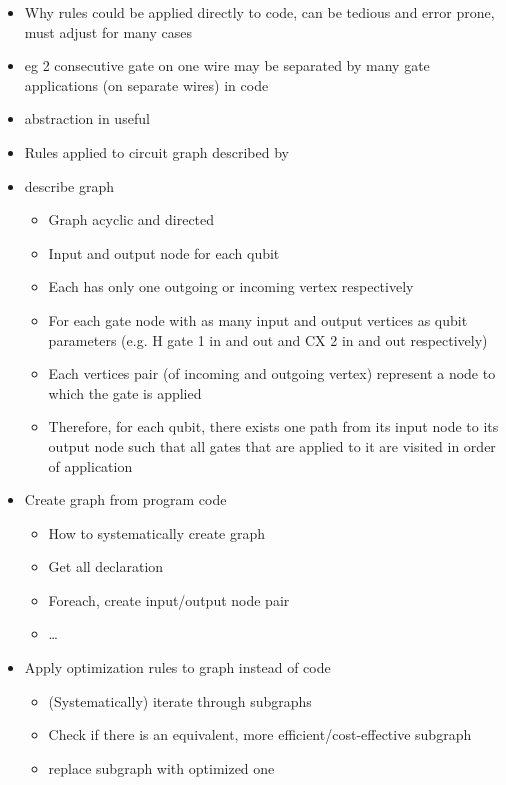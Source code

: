 \begin{itemize}
    \item Why rules could be applied directly to code, can be tedious and error prone, must adjust for many cases
    \item eg 2 consecutive gate on one wire may be separated by many gate applications (on separate wires) in code
    \item abstraction in useful
    \item Rules applied to circuit graph described by \cite{KMO*23}
    \item describe graph
    \begin{itemize}
        \item Graph acyclic and directed
        \item Input and output node for each qubit
        \item Each has only one outgoing or incoming vertex respectively
        \item For each gate node with as many input and output vertices as qubit parameters (e.g. H gate 1 in and out and CX 2 in and out respectively)
        \item Each vertices pair (of incoming and outgoing vertex) represent a node to which the gate is applied
        \item Therefore, for each qubit, there exists one path from its input node to its output node such that all gates that are applied to it are visited in order of application
    \end{itemize}
    \item Create graph from program code
    \begin{itemize}
        \item How to systematically create graph
        \item Get all declaration
        \item Foreach, create input/output node pair
        \item \dots
    \end{itemize}
    \item Apply optimization rules to graph instead of code
    \begin{itemize}
        \item (Systematically) iterate through subgraphs 
        \item Check if there is an equivalent, more efficient/cost-effective subgraph
        \item replace subgraph with optimized one 
    \end{itemize}
\end{itemize}